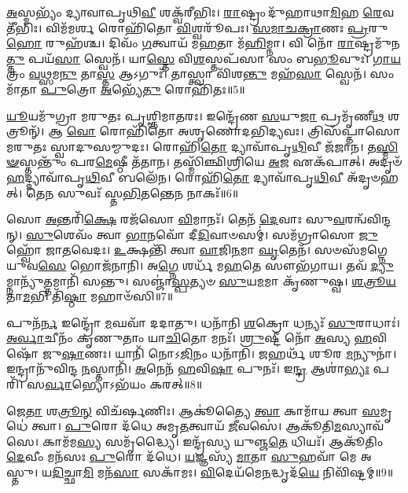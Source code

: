 \-\ul{𑌅}\-𑌸𑍍𑌮𑌭𑍍𑌯𑌂᳴ 𑌦𑍍𑌯𑌾𑌵𑌾𑌪𑍃𑌥𑌿\-\ul{𑌵𑍀} 𑌶𑌕𑍍𑌵᳴𑌰𑍀𑌭𑌿𑌃।
\-\ul{𑌰𑌾}\-𑌷𑍍𑌟𑍍𑌰𑌂 𑌦𑍁᳴𑌹𑌾𑌥𑌾\-\ul{𑌮𑌿}\-𑌹 \ul{𑌰𑍇}\-𑌵𑌤𑍀᳴𑌭𑌿𑌃।
𑌵𑌿𑌮᳴𑌮𑌰𑍍\mbox{}\-\ul{𑌶} 𑌰𑍋𑌹𑌿᳴𑌤𑍋 \ul{𑌵𑌿}\-𑌶𑍍𑌵𑌰𑍂᳴𑌪𑌃।
\-\ul{𑌸}\-\-\ul{𑌮𑌾}\-\-\ul{𑌚}\-\-\ul{𑌕𑍍𑌰𑌾}\-𑌣𑌃 \ul{𑌪𑍍𑌰}\-𑌰𑍁\-\ul{𑌹𑍋} 𑌰𑍁𑌹᳴𑌶𑍍𑌚।
𑌦𑌿𑌵𑌂᳴ \ul{𑌗}\-𑌤𑍍𑌵𑌾𑌯᳴ 𑌮\-\ul{𑌹}\-𑌤𑌾 𑌮᳴\-\ul{𑌹𑌿}\-𑌮𑍍𑌨𑌾।
𑌵𑌿 𑌨𑍋᳴ \ul{𑌰𑌾}\-𑌷𑍍𑌟𑍍𑌰𑌮𑍁᳴𑌨\-\ul{𑌤𑍍𑌤𑍁} 𑌪𑌯᳴\-\ul{𑌸𑌾} 𑌸𑍍𑌵𑍇𑌨᳴।
𑌯𑌾\-\ul{𑌸𑍍𑌤𑍇} 𑌵𑌿\-\ul{𑌶}\-𑌸𑍍𑌤𑌪᳴𑌸𑌾 𑌸𑌂 𑌬\-\ul{𑌭𑍂}\-𑌵𑍁𑌃।
\-\ul{𑌗𑌾}\-\-\ul{𑌯}\-𑌤𑍍𑌰𑌂 \ul{𑌵}\-𑌥𑍍𑌸𑌮\-\ul{𑌨𑍁} 𑌤𑌾\-\ul{𑌸𑍍𑌤} 𑌆𑌽𑌗𑍁𑌃᳴।
𑌤𑌾𑌸𑍍𑌤𑍍𑌵𑌾 𑌵𑌿᳴𑌶\-\ul{𑌨𑍍𑌤𑍁} 𑌮𑌹᳴\-\ul{𑌸𑌾} 𑌸𑍍𑌵𑍇𑌨᳴।
𑌸𑌂 𑌮𑌾᳴𑌤𑌾 \ul{𑌪𑍁}\-𑌤𑍍𑌰𑍋 \ul{𑌅}\-𑌭𑍍𑌯𑍇᳴\-\ul{𑌤𑍁} 𑌰𑍋𑌹𑌿᳴𑌤𑌃॥5॥

\-\ul{𑌯𑍂}\-𑌯𑌮𑍁᳴𑌗𑍍𑌰𑌾 𑌮𑌰𑍁𑌤𑌃 𑌪𑍃𑌶𑍍𑌞𑌿𑌮𑌾𑌤𑌰𑌃।
𑌇𑌨𑍍𑌦𑍍𑌰𑍇᳴𑌣 \ul{𑌸}\-𑌯𑍁\-\ul{𑌜𑌾} 𑌪𑍍𑌰𑌮𑍃᳴𑌣𑍀\-\ul{𑌥} 𑌶𑌤𑍍𑌰𑍂𑌨𑍍᳴।
𑌆 \ul{𑌵𑍋} 𑌰𑍋𑌹𑌿᳴𑌤𑍋 𑌅𑌶𑍃𑌣𑍋𑌦𑌭𑌿𑌦𑍍𑌯𑌵𑌃।
𑌤𑍍𑌰𑌿𑌸᳴𑌪𑍍𑌤𑌾𑌸𑍋 𑌮𑌰𑍁𑌤𑌃 𑌸𑍍𑌵𑌾𑌦𑍁𑌸𑌮𑍍𑌮𑍁𑌦𑌃।
𑌰𑍋𑌹𑌿᳴\-\ul{𑌤𑍋} 𑌦𑍍𑌯𑌾𑌵𑌾᳴𑌪𑍃\-\ul{𑌥𑌿}\-𑌵𑍀 𑌜᳴𑌜𑌾𑌨।
𑌤\-\ul{𑌸𑍍𑌮𑌿}\-\-\ul{𑍟}\-𑌸𑍍𑌤𑌨𑍍𑌤𑍁𑌂᳴ 𑌪𑌰\-\ul{𑌮𑍇}\-𑌷𑍍𑌠𑍀 𑌤᳴𑌤𑌾𑌨।
𑌤𑌸𑍍𑌮𑌿᳴𑌞𑍍𑌛𑌿𑌶𑍍𑌰𑌿𑌯𑍇 \ul{𑌅}\-𑌜 𑌏𑌕᳴𑌪𑌾𑌤𑍍।
𑌅𑌦𑍃𑍞᳴\-\ul{𑌹}\-𑌦𑍍𑌦𑍍𑌯𑌾𑌵𑌾᳴𑌪𑍃\-\ul{𑌥𑌿}\-𑌵𑍀 𑌬𑌲𑍇᳴𑌨।
𑌰𑍋𑌹𑌿᳴\-\ul{𑌤𑍋} 𑌦𑍍𑌯𑌾𑌵𑌾᳴𑌪𑍃\-\ul{𑌥𑌿}\-𑌵𑍀 𑌅᳴𑌦𑍃𑍞𑌹𑌤𑍍।
𑌤𑍇\-\ul{𑌨} 𑌸𑍁𑌵𑌃᳴ 𑌸𑍍𑌤\-\ul{𑌭𑌿}\-𑌤𑌨𑍍𑌤𑍇\-\ul{𑌨} 𑌨𑌾𑌕𑌃᳴॥6॥

𑌸𑍋 \ul{𑌅}\-𑌨𑍍𑌤𑌰𑌿᳴\-\ul{𑌕𑍍𑌷𑍇} 𑌰𑌜᳴𑌸𑍋 \ul{𑌵𑌿}\-𑌮𑌾𑌨𑌃᳴।
𑌤𑍇𑌨᳴ \ul{𑌦𑍇}\-𑌵𑌾𑌃 𑌸𑍁\-\ul{𑌵}\-𑌰𑌨𑍍𑌵᳴𑌵𑌿𑌨𑍍𑌦𑌨𑍍।
\-\ul{𑌸𑍁}\-𑌶𑍇𑌵𑌂᳴ 𑌤𑍍𑌵𑌾 \ul{𑌭𑌾}\-𑌨𑌵𑍋᳴ 𑌦𑍀\-\ul{𑌦𑌿}\-𑌵𑌾𑍞𑌸𑌮𑍍॑।
𑌸𑌮᳴𑌗𑍍𑌰𑌾𑌸𑍋 \ul{𑌜𑍁}\-𑌹𑍍𑌵𑍋᳴ 𑌜𑌾𑌤𑌵𑍇𑌦𑌃।
\-\ul{𑌉}\-𑌕𑍍𑌷𑌨𑍍𑌤𑌿᳴ 𑌤𑍍𑌵𑌾 \ul{𑌵𑌾}\-𑌜𑌿\-\ul{𑌨}\-𑌮𑌾 \ul{𑌘𑍃}\-𑌤𑍇𑌨᳴।
𑌸𑍞𑌸᳴𑌮𑌗𑍍𑌨𑍇 𑌯𑍁𑌵\-\ul{𑌸𑍇} 𑌭𑍋𑌜᳴𑌨𑌾𑌨𑌿।
𑌅\-\ul{𑌗𑍍𑌨𑍇} 𑌶𑌰𑍍𑌧᳴ 𑌮\-\ul{𑌹}\-𑌤𑍇 𑌸𑍗𑌭᳴𑌗𑌾𑌯।
𑌤𑌵᳴ \ul{𑌦𑍍𑌯𑍁}\-𑌮𑍍𑌨𑌾𑌨𑍍𑌯𑍁᳴\-\ul{𑌤𑍍𑌤}\-𑌮𑌾𑌨𑌿᳴ 𑌸𑌨𑍍𑌤𑍁।
𑌸𑌞𑍍𑌜𑌾॑\-\ul{𑌸𑍍𑌪}\-𑌤𑍍𑌯𑍞 \ul{𑌸𑍁}\-𑌯\-\ul{𑌮}\-𑌮𑌾 𑌕𑍃᳴𑌣𑍁𑌷𑍍𑌵।
\-\ul{𑌶}\-\-\ul{𑌤𑍍𑌰𑍂}\-\-\ul{𑌯}\-𑌤𑌾\-\ul{𑌮}\-𑌭𑌿 𑌤𑌿᳴\-\ul{𑌷𑍍𑌠𑌾} 𑌮𑌹𑌾𑍞᳴𑌸𑌿॥7॥\anuvakamend[\-\ul{𑌅}\-\-\ul{𑌸𑍍𑌤𑍍𑌵𑍇}\-\-\ul{𑌤𑍁} 𑌰𑍋𑌹𑌿᳴\-\ul{𑌤𑍋} 𑌨𑌾\-\ul{𑌕𑍋} 𑌮𑌹𑌾𑍞᳴𑌸𑌿]

𑌪𑍁𑌨᳴\-\ul{𑌰𑍍𑌨} 𑌇𑌨𑍍𑌦𑍍𑌰𑍋᳴ \ul{𑌮}\-𑌘𑌵𑌾᳴ 𑌦𑌦𑌾𑌤𑍁।
𑌧𑌨𑌾᳴𑌨𑌿 \ul{𑌶}\-𑌕𑍍𑌰𑍋 𑌧𑌨𑍍𑌯𑌃᳴ \ul{𑌸𑍁}\-𑌰𑌾𑌧𑌾𑌃॑।
\-\ul{𑌅}\-\-\ul{𑌰𑍍𑌵𑌾}\-𑌚𑍀𑌨𑌂᳴ 𑌕𑍃𑌣𑍁𑌤𑌾𑌂 𑌯𑌾\-\ul{𑌚𑌿}\-𑌤𑍋 𑌮𑌨𑌃᳴।
\-\ul{𑌶𑍍𑌰𑍁}\-𑌷𑍍𑌟𑍀 𑌨𑍋᳴ \ul{𑌅}\-𑌸𑍍𑌯 \ul{𑌹}\-𑌵𑌿𑌷𑍋᳴ 𑌜𑍁\-\ul{𑌷𑌾}\-𑌣𑌃।
𑌯𑌾𑌨𑌿᳴ 𑌨𑍋𑌽\-\ul{𑌜𑌿}\-𑌨𑌂 𑌧𑌨𑌾᳴𑌨𑌿।
\-\ul{𑌜}\-𑌹𑌰𑍍𑌥᳴ 𑌶𑍂𑌰 \ul{𑌮}\-𑌨𑍍𑌯𑍁𑌨𑌾॑।
𑌇𑌨𑍍𑌦𑍍𑌰𑌾𑌨𑍁᳴𑌵𑌿𑌨𑍍𑌦 \ul{𑌨}\-𑌸𑍍𑌤𑌾𑌨𑌿᳴।
\-\ul{𑌅}\-𑌨𑍇𑌨᳴ \ul{𑌹}\-𑌵𑌿\-\ul{𑌷𑌾} 𑌪𑍁𑌨𑌃᳴।
𑌇\-\ul{𑌨𑍍𑌦𑍍𑌰} 𑌆𑌶𑌾॑\-\ul{𑌭𑍍𑌯𑌃} 𑌪𑌰𑌿᳴।
𑌸\-\ul{𑌰𑍍𑌵𑌾}\-𑌭𑍍𑌯𑍋\-𑌽𑌭᳴𑌯𑌂 𑌕𑌰𑌤𑍍॥8॥

𑌜𑍇\-\ul{𑌤𑌾} 𑌶\-\ul{𑌤𑍍𑌰𑍂}\-\-\ul{𑌨𑍍} 𑌵𑌿𑌚᳴𑌰𑍍\mbox{}𑌷𑌣𑌿𑌃।
𑌆𑌕𑍂॑𑌤𑍍𑌯𑍈 \ul{𑌤𑍍𑌵𑌾} 𑌕𑌾𑌮𑌾᳴𑌯 𑌤𑍍𑌵𑌾 \ul{𑌸}\-𑌮𑍃𑌧𑍇॑ 𑌤𑍍𑌵𑌾।
\-\ul{𑌪𑍁}\-𑌰𑍋 𑌦᳴𑌧𑍇 𑌅𑌮𑍃\-\ul{𑌤}\-𑌤𑍍𑌵𑌾𑌯᳴ \ul{𑌜𑍀}\-𑌵𑌸𑍇॑।
𑌆𑌕𑍂᳴𑌤𑌿\-\ul{𑌮}\-𑌸𑍍𑌯𑌾𑌵᳴𑌸𑍇।
𑌕𑌾𑌮᳴𑌮\-\ul{𑌸𑍍𑌯} 𑌸𑌮𑍃᳴𑌦𑍍𑌧𑍍𑌯𑍈।
𑌇𑌨𑍍𑌦𑍍𑌰᳴𑌸𑍍𑌯 𑌯𑍁𑌞𑍍𑌜\-\ul{𑌤𑍇} 𑌧𑌿𑌯𑌃᳴।
𑌆𑌕𑍂᳴𑌤𑌿𑌂 \ul{𑌦𑍇}\-𑌵𑍀𑌂 𑌮𑌨᳴𑌸𑌃 \ul{𑌪𑍁}\-𑌰𑍋 𑌦᳴𑌧𑍇।
\-\ul{𑌯}\-𑌜𑍍𑌞𑌸𑍍𑌯᳴ \ul{𑌮𑌾}\-𑌤𑌾 \ul{𑌸𑍁}\-𑌹𑌵𑌾᳴ 𑌮𑍇 𑌅𑌸𑍍𑌤𑍁।
𑌯\-\ul{𑌦𑌿}\-𑌚𑍍𑌛𑌾\-\ul{𑌮𑌿} 𑌮𑌨᳴\-\ul{𑌸𑌾} 𑌸𑌕𑌾᳴𑌮𑌃।
\-\ul{𑌵𑌿}\-𑌦𑍇𑌯᳴𑌮𑍇\-\ul{𑌨}\-𑌦𑍍𑌧𑍃𑌦᳴\-\ul{𑌯𑍇} 𑌨𑌿𑌵𑌿᳴𑌷𑍍𑌟𑌮𑍍॥9॥

